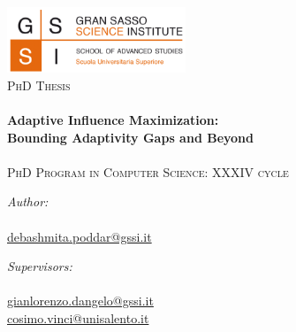 \documentclass[11pt, a4paper, oneside]{Thesis} %
\begin{document}
\begin{titlepage}
\begin{center}

\includegraphics[width=0.4\textwidth]{./figures/logo_GSSI}~\\[1cm]
\textsc{\Large PhD Thesis}\\[0.5cm] %

\HRule \\[0.1cm] %
{\huge \bfseries Adaptive Influence Maximization: \\[0.3cm] Bounding Adaptivity Gaps and Beyond}\\[0.3cm] %
\HRule \\[0.9cm] %

{\Large \textsc{PhD Program in Computer Science: XXXIV cycle}}\\[2cm]

\begin{minipage}{0.4\textwidth}
\begin{flushleft} \large
\emph{Author:}\\
\bigskip \authornames \\
\href{mailto:debashmita.poddar@gssi.it}{debashmita.poddar@gssi.it}
\end{flushleft}
\end{minipage}
\begin{minipage}{0.5\textwidth}
\begin{flushright} \large
\emph{Supervisors:} \\
\bigskip \supname \\
\href{mailto:gianlorenzo.dangelo@gssi.it}{gianlorenzo.dangelo@gssi.it\\ cosimo.vinci@unisalento.it} \\
\end{flushright}
\end{minipage}\\[2.2cm]
 

\end{center}
\end{titlepage}
\end{document}
